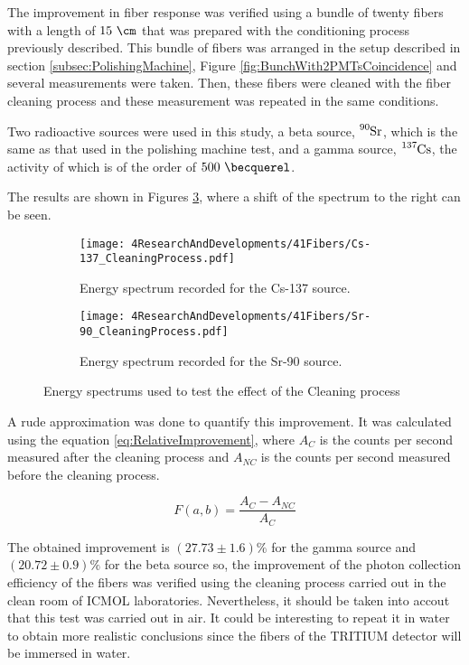 The improvement in fiber response was verified using a bundle of twenty fibers with a length of $15~\cm$ that was prepared with the conditioning process previously described. This bundle of fibers was arranged in the setup described in section \ref{subsec:PolishingMachine}, Figure \ref{fig:BunchWith2PMTsCoincidence} and several measurements were taken. Then, these fibers were cleaned with the fiber cleaning process and these measurement was repeated in the same conditions.

Two radioactive sources were used in this study, a beta source, $\ce{^{90}Sr}$, which is the same as that used in the polishing machine test, and a gamma source, $\ce{^{137}Cs}$, the activity of which is of the order of $500~\becquerel$.

The results are shown in Figures \ref{fig:ResultsOfCleaningProcess}, where a shift of the spectrum to the right can be seen. 

\begin{figure}
\centering
    \begin{subfigure}[b]{0.76\textwidth}
    \centering
    \texttt{[image: 4ResearchAndDevelopments/41Fibers/Cs-137\_CleaningProcess.pdf]}  
    \caption{Energy spectrum recorded for the Cs-137 source.\label{subfig:EnergySpectrumCo60CleaningTest}}
    \end{subfigure}
    \hfill
    \begin{subfigure}[b]{0.76\textwidth}
    \centering
    \texttt{[image: 4ResearchAndDevelopments/41Fibers/Sr-90\_CleaningProcess.pdf]}  
    \caption{Energy spectrum recorded for the Sr-90 source.\label{subfig:EnergySpectrumSr90CleaningTest}}
    \end{subfigure}
 \caption{Energy spectrums used to test the effect of the Cleaning process}
 \label{fig:ResultsOfCleaningProcess}
\end{figure}

A rude approximation was done to quantify this improvement. It was calculated using the equation \ref{eq:RelativeImprovement}, where $A_{C}$ is the counts per second measured after the cleaning process and $A_{NC}$ is the counts per second measured before the cleaning process.

\begin{equation}
F(a,b)=\frac{A_{C}-A_{NC}}{A_{C}}
\label{eq:RelativeImprovement}
\end{equation}

The obtained improvement is $(27.73 \pm 1.6)\%$ for the gamma source and $(20.72 \pm 0.9)\%$ for the beta source so, the improvement of the photon collection efficiency of the fibers was verified using the cleaning process carried out in the clean room of ICMOL laboratories. Nevertheless, it should be taken into accout that this test was carried out in air. It could be interesting to repeat it in water to obtain more realistic conclusions since the fibers of the TRITIUM detector will be immersed in water.